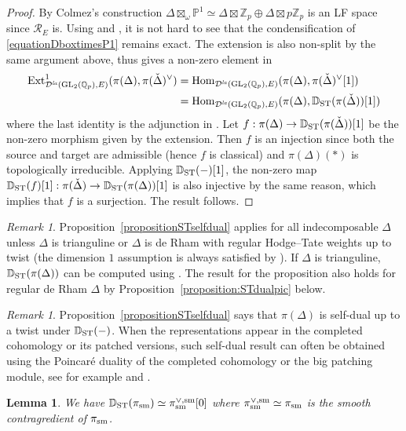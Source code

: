 \documentclass[a4paper,10pt]{amsart}
\theoremstyle{remark}
\newtheorem{remark}[theorem]{Remark}
\theoremstyle{definition}
\theoremstyle{plain}
\newtheorem{lemma}[theorem]{Lemma}
\numberwithin{equation}{section}
\newcommand{\bbD}{{\mathbb D}}
\newcommand{\bbP}{{\mathbb P}}
\newcommand{\bbQ}{{\mathbb Q}}
\newcommand{\bbZ}{{\mathbb Z}}
\newcommand{\calD}{{\mathcal D}}
\newcommand{\calR}{{\mathcal R}}
\newcommand{\Ext}{{\rm Ext}}
\newcommand{\GL}{{\rm GL}}
\newcommand{\Hom}{{\rm Hom}}
\newcommand{\la}{{\it la}}
\newcommand{\sm}{{\rm sm}}
\newcommand{\ST}{{\rm ST}}
\begin{document}
\begin{proof}
	By Colmez's construction $\Delta\boxtimes_{\omega} \bbP^1\simeq \Delta\boxtimes \bbZ_p\oplus \Delta\boxtimes p\bbZ_p$ is an LF space since $\calR_E$ is. Using \cite[Lem.~A.33]{bosco2021drinfeldproetale} and \cite[Lem.~3.2]{steingart2024higher}, it is not hard to see that the condensification of \eqref{equationDboxtimesP1} remains exact. The extension is also non-split by the same argument above, thus gives a non-zero element in 
	\begin{align*}
		\Ext^1_{\calD^{\la}(\GL_2(\bbQ_p),E)}(\pi(\Delta),\pi(\check\Delta)^{\vee})&=\Hom_{\calD^{\la}(\GL_2(\bbQ_p),E)}(\pi(\Delta),\pi(\check\Delta)^{\vee}[1])\\
		&=\Hom_{\calD^{\la}(\GL_2(\bbQ_p),E)}(\pi(\Delta),\bbD_{\ST}(\pi(\check\Delta))[1])
	\end{align*}
	where the last identity is the adjunction in \cite[Cor.~3.3.7]{JC23}. Let $f:\pi(\Delta)\rightarrow \bbD_{\ST}(\pi(\check\Delta))[1]$ be the non-zero morphism given by the extension. Then $f$ is an injection since both the source and target are admissible (hence $f$ is classical) and $\pi(\Delta)(*)$ is topologically irreducible. Applying $\bbD_{\ST}(-)[1]$, the non-zero map $\bbD_{\ST}(f)[1]:\pi(\check\Delta)\rightarrow \bbD_{\ST}(\pi(\Delta))[1]$ is also injective by the same reason, which implies that $f$ is a surjection. The result follows. 
\end{proof}
\begin{remark}
	Proposition~\ref{propositionSTselfdual} applies for all indecomposable $\Delta$ unless $\Delta$ is trianguline or $\Delta$ is de Rham with regular Hodge--Tate weights up to twist \cite[Thm.0.3]{colmez2018poids} (the dimension $1$ assumption is always satisfied by \cite[Thm.~1.5]{DPS2024GKJL}). If $\Delta$ is trianguline, $\bbD_{\ST}(\pi(\Delta))$ can be computed using \cite[\S~6]{ST05}. The result for the proposition also holds for regular de Rham $\Delta$ by Proposition~\ref{proposition:STdualpic} below.
\end{remark}
\begin{remark}
	Proposition~\ref{propositionSTselfdual} says that $\pi(\Delta)$ is self-dual up to a twist under $\bbD_{\ST}(-)$. When the representations appear in the completed cohomology or its patched versions, such self-dual result can often be obtained using the Poincar\'e duality of the completed cohomology or the big patching module, see for example \cite[Thm.~8.2]{huWang2022modp} and \cite[Appendix D]{Ding2024wall}. 
\end{remark}
\begin{lemma}\label{lemma:ST-smooth-dual}
	We have $\bbD_{\ST}(\pi_{\sm})\simeq\pi_{\sm}^{\vee,\sm}[0]$ where $ \pi_{\sm}^{\vee,\sm}\simeq \pi_{\sm}$ is the smooth contragredient of $\pi_{\sm}$.
\end{lemma}
\end{document}
